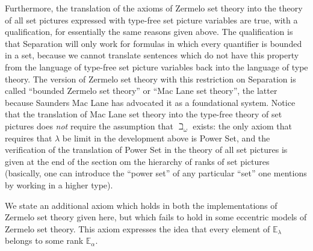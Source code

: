 \documentclass[12pt]{book}
\begin{document}
Furthermore, the translation of the axioms of Zermelo set theory into
the theory of all set pictures expressed with type-free set picture
variables are true, with a qualification, for essentially the same
reasons given above.  The qualification is that Separation will only
work for formulas in which every quantifier is bounded in a set,
because we cannot translate sentences which do not have this property
from the language of type-free set picture variables back into the
language of type theory.  The version of Zermelo set theory with this
restriction on Separation is called ``bounded Zermelo set theory'' or
``Mac Lane set theory'', the latter because Saunders Mac Lane has
advocated it as a foundational system.  Notice that the translation of
Mac Lane set theory into the type-free theory of set pictures does
{\em not\/} require the assumption that $\beth_{\omega}$ exists: the
only axiom that requires that $\lambda$ be limit in the development
above is Power Set, and the verification of the translation of Power
Set in the theory of all set pictures is given at the end of the
section om the hierarchy of ranks of set pictures (basically, one can introduce the ``power set'' of
any particular ``set'' one mentions by working in a higher type).

We state an additional axiom which holds in both the implementations
of Zermelo set theory given here, but which fails to hold in some
eccentric models of Zermelo set theory.  This axiom expresses the idea
that every element of ${\mathbb E}_{\lambda}$ belongs to some rank
${\mathbb E}_{\alpha}$.
\end{document}
